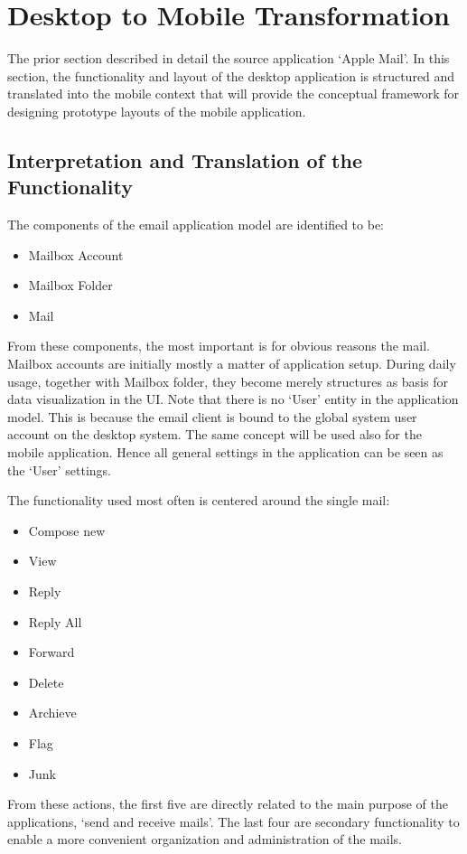 \documentclass[a4paper,11pt,twoside]{article}
\begin{document}
\section{Desktop to Mobile Transformation}
The prior section described in detail the source application `Apple Mail'. In this
section, the functionality and layout of the desktop application is structured
and translated into the mobile context that will provide the conceptual framework
for designing prototype layouts of the mobile application.

\subsection{Interpretation and Translation of the Functionality}
The components of the email application model are identified to be:
\begin{itemize}
  \item Mailbox Account
  \item Mailbox Folder
  \item Mail
\end{itemize}

From these components, the most important is for obvious reasons the mail. Mailbox
accounts are initially mostly a matter of application setup. During daily usage,
together with Mailbox folder, they become merely structures as basis for
data visualization in the UI. Note that there is no `User' entity in the
application model. This is because the email client is bound to the global system
user account on the desktop system. The same concept will be used also for the
mobile application. Hence all general settings in the application can be seen
as the `User' settings.


The functionality used most often is centered around the single mail:
\begin{itemize}
  \item Compose new
  \item View
  \item Reply
  \item Reply All
  \item Forward
  \item Delete
  \item Archieve
  \item Flag
  \item Junk
\end{itemize}

From these actions, the first five are directly related to the main purpose of
the applications, `send and receive mails'. The last four are secondary
functionality to enable a more convenient organization and administration of
the mails.
\end{document}

